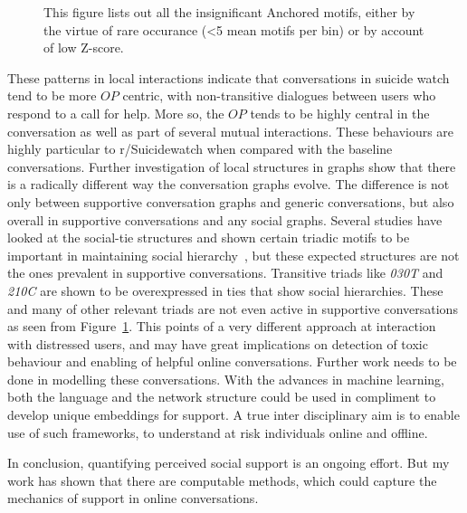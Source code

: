 \begin{figure}[htb]
    
    \caption{ This figure lists out all the insignificant Anchored motifs, either by the virtue of rare occurance (<5 mean motifs per bin) or by account of low Z-score. }
    
    \label{fig:Rare_motifs}
\end{figure}

These patterns in local interactions indicate that conversations in suicide watch tend to be more $OP$ centric, with non-transitive dialogues between users who respond to a call for help. More so, the $OP$ tends to be highly central in the conversation as well as part of several mutual interactions. These behaviours are highly particular to r/Suicidewatch when compared with the baseline conversations. Further investigation of local structures in graphs show that there is a radically different way the conversation graphs evolve. The difference is not only between supportive conversation graphs and generic conversations, but also overall in supportive conversations and any social graphs. Several studies have looked at the social-tie structures and shown certain triadic motifs to be important in maintaining social hierarchy~\cite{shizuka2015network,shizuka2012social,holland1976local,doi:10.1177/104649647100200201}, but these expected structures are not the ones prevalent in supportive conversations. Transitive triads like \textsl{030T} and \textsl{210C} are shown to be overexpressed in ties that show social hierarchies. These and many of other relevant triads are not even active in supportive conversations as seen from Figure~\ref{fig:Rare_motifs}.  This points of a very different approach at interaction with distressed users, and may have great implications on detection of toxic behaviour and enabling of helpful online conversations. Further work needs to be done in modelling these conversations. With the advances in machine learning, both the language and the network structure could be used in compliment to develop unique embeddings for support. A true inter disciplinary aim is to enable use of such frameworks, to understand at risk individuals online and offline.

In conclusion, quantifying perceived social support is an ongoing effort. But my work has shown that there are computable methods, which could capture the mechanics of support in online conversations.  

